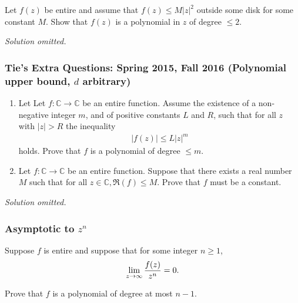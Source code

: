 \begin{problem}[?]

Let \(f(z)\) be entire and assume that \(f(z) \leq M |z|^2\) outside
some disk for some constant \(M\). Show that \(f(z)\) is a polynomial in
\(z\) of degree \(\leq 2\).

\end{problem}

\emph{Solution omitted.}

\hypertarget{ties-extra-questions-spring-2015-fall-2016-polynomial-upper-bound-d-arbitrary}{%
\subsubsection{\texorpdfstring{Tie's Extra Questions: Spring 2015, Fall
2016 (Polynomial upper bound, \(d\)
arbitrary)}{Tie's Extra Questions: Spring 2015, Fall 2016 (Polynomial upper bound, d arbitrary)}}\label{ties-extra-questions-spring-2015-fall-2016-polynomial-upper-bound-d-arbitrary}}

\begin{problem}[?]

\begin{enumerate}
\def\labelenumi{\alph{enumi}.}
\item
  Let Let \(f:{\mathbb C}\rightarrow {\mathbb C}\) be an entire
  function. Assume the existence of a non-negative integer \(m\), and of
  positive constants \(L\) and \(R\), such that for all \(z\) with
  \(|z|>R\) the inequality
  \begin{align*}|f(z)| \leq L |z|^m\end{align*}
  holds. Prove that \(f\) is a polynomial of degree \(\leq m\).
\item
  Let \(f:{\mathbb C}\rightarrow {\mathbb C}\) be an entire function.
  Suppose that there exists a real number \(M\) such that for all
  \(z\in {\mathbb C}, \Re(f) \leq M\). Prove that \(f\) must be a
  constant.
\end{enumerate}

\end{problem}

\emph{Solution omitted.}

\hypertarget{asymptotic-to-zn}{%
\subsubsection{\texorpdfstring{Asymptotic to
\(z^n\)}{Asymptotic to z\^{}n}}\label{asymptotic-to-zn}}

\begin{problem}[?]

Suppose \(f\) is entire and suppose that for some integer \(n\geq 1\),
\begin{align*}
\lim_{z\to \infty} {f(z) \over z^n} = 0
.\end{align*}

Prove that \(f\) is a polynomial of degree at most \(n-1\).

\end{problem}

